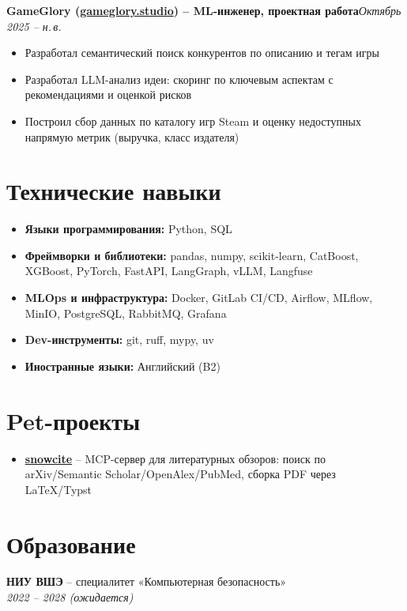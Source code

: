\documentclass[a4paper,11pt]{article}
\begin{document}
\textbf{GameGlory (\href{https://gameglory.studio/}{gameglory.studio}) -- ML-инженер, проектная работа}\hfill \textit{Октябрь 2025 -- н.\,в.}

\begin{itemize}
  \item Разработал семантический поиск конкурентов по описанию и тегам игры
  \item Разработал LLM-анализ идеи: скоринг по ключевым аспектам с рекомендациями и оценкой рисков
  \item Построил сбор данных по каталогу игр Steam и оценку недоступных напрямую метрик (выручка, класс издателя)
\end{itemize}

\section*{Технические навыки}
\begin{itemize}
  \item \textbf{Языки программирования:} Python, SQL
  \item \textbf{Фреймворки и библиотеки:} pandas, numpy, scikit-learn, CatBoost, XGBoost, PyTorch, FastAPI, LangGraph, vLLM, Langfuse
  \item \textbf{MLOps и инфраструктура:} Docker, GitLab CI/CD, Airflow, MLflow, MinIO, PostgreSQL, RabbitMQ, Grafana
  \item \textbf{Dev-инструменты:} git, ruff, mypy, uv
  \item \textbf{Иностранные языки:} Английский (B2)
\end{itemize}

\section*{Pet-проекты}
\begin{itemize}
  \item \href{https://github.com/notaskynet/snowcite}{\textbf{snowcite}} -- MCP-сервер для литературных обзоров: поиск по arXiv/Semantic Scholar/OpenAlex/PubMed, сборка PDF через LaTeX/Typst
\end{itemize}

\section*{Образование}
\textbf{НИУ ВШЭ} -- специалитет «Компьютерная безопасность»\\
\textit{2022 -- 2028 (ожидается)}
\end{document}
